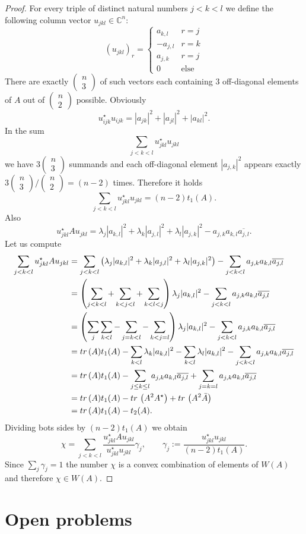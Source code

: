 \documentclass[10pt,a4paper,reqno]{amsart}
\newcommand{\nadsebou}[2]{\begin{array}{c} #1 \\ #2 \end{array}}
\newcommand{\zav}[1]{\left( #1 \right)}
\newcommand{\tr}{{\rm tr}\,}
\begin{document}
\begin{proof}
For every triple of distinct natural numbers $j<k<l$ we define the following column vector $u_{jkl}\in \mathbb{C}^{n}$:
$$
\zav{u_{jkl}}_r=\left\{ \begin{array}{cc} 
a_{k,l} & r=j\\ 
-a_{j,l} & r=k\\ 
a_{j,k} & r=j\\
0 & \text{else} 
 \end{array} \right.
$$
There are exactly $\zav{\nadsebou{n}{3}}$ of such vectors each containing $3$ off-diagonal elements of $A$ out of $\zav{\nadsebou{n}{2}}$ possible.
Obviously
$$
u_{ijk}^\star u_{ijk}=|a_{jk}|^2+|a_{jl}|^2+|a_{kl}|^2.
$$
In the sum
$$
\sum_{j<k<l}u_{jkl}^\star u_{jkl}
$$
we have $3\zav{\nadsebou{n}{3}}$ summands and each off-diagonal element $|a_{j,k}|^2$ appears exactly $3\zav{\nadsebou{n}{3}}/\zav{\nadsebou{n}{2}}=(n-2)$ times. Therefore it holds
$$
\sum_{j<k<l}u_{jkl}^\star u_{jkl}=(n-2)t_1(A).
$$
Also
$$
u_{jkl}^\star A u_{jkl}=\lambda_j |a_{k,l}|^2+\lambda_k |a_{j,l}|^2+\lambda_{l} |a_{j,k}|^2-a_{j,k}a_{k,l}\overline{a_{j,l}}.
$$
Let us compute
\begin{align*}
\sum_{j<k<l}u_{jkl}^\star A u_{jkl}&=\sum_{j<k<l}\zav{\lambda_j |a_{k,l}|^2+\lambda_k |a_{j,l}|^2+\lambda_{l} |a_{j,k}|^2}-\sum_{j<k<l}a_{j,k}a_{k,l}\overline{a_{j,l}}\\
&=\zav{\sum_{j<k<l}+\sum_{k<j<l}+\sum_{k<l<j}}\lambda_j |a_{k,l}|^2-\sum_{j<k<l}a_{j,k}a_{k,l}\overline{a_{j,l}}\\
&=\zav{\sum_{j}\sum_{k<l}-\sum_{j=k<l}-\sum_{k<j=l}}\lambda_j |a_{k,l}|^2-\sum_{j<k<l}a_{j,k}a_{k,l}\overline{a_{j,l}}\\
&=\tr(A)t_1(A)-\sum_{k<l}\lambda_k |a_{k,l}|^2-\sum_{k<l}\lambda_l |a_{k,l}|^2-\sum_{j<k<l}a_{j,k}a_{k,l}\overline{a_{j,l}}\\
&=\tr(A)t_1(A)-\sum_{j\leq k\leq l}a_{j,k}a_{k,l}\overline{a_{j,l}}+\sum_{j=k= l}a_{j,k}a_{k,l}\overline{a_{j,l}}\\
&=\tr(A)t_1(A)-\tr\zav{A^2A^\star}+\tr \zav{A^2\bar A}\\
&=\tr(A)t_1(A)-t_2(A).
\end{align*}
Dividing bots sides by $(n-2)t_1(A)$ we obtain
$$
\chi=\sum_{j<k<l}\frac{u_{jkl}^\star A u_{jkl}}{u_{jkl}^\star u_{jkl}}\gamma_j,\qquad \gamma_j:=\frac{u_{jkl}^\star u_{jkl}}{(n-2)t_1(A)}.
$$
Since $\sum_j\gamma_j=1$ the number $\chi$ is a convex combination of elements of $W(A)$ and therefore $\chi\in W(A)$. 
\end{proof}

\section{Open problems}
\end{document}
